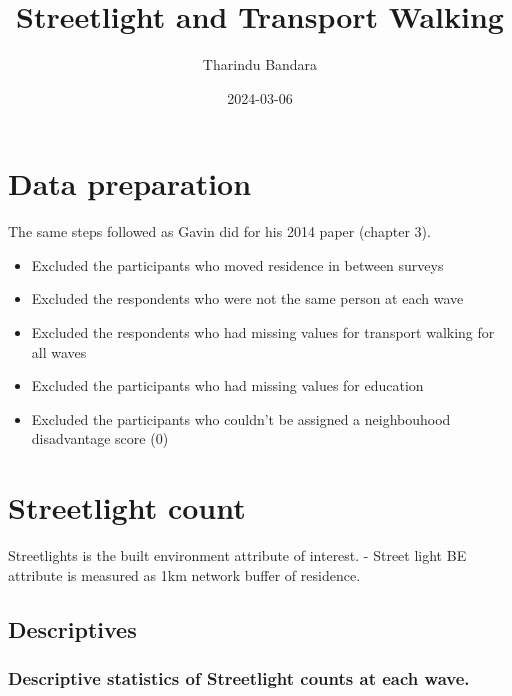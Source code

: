 \documentclass[
]{book}
\title{Streetlight and Transport Walking}
\author{Tharindu Bandara}
\date{2024-03-06}
\providecommand{\tightlist}{%
  \setlength{\itemsep}{0pt}\setlength{\parskip}{0pt}}
\begin{document}
\maketitle

{
\setcounter{tocdepth}{1}
\tableofcontents
}
\hypertarget{data-preparation}{%
\chapter{Data preparation}\label{data-preparation}}

The same steps followed as Gavin did for his 2014 paper (chapter 3).

\begin{itemize}
\tightlist
\item
  Excluded the participants who moved residence in between surveys
\item
  Excluded the respondents who were not the same person at each wave
\item
  Excluded the respondents who had missing values for transport walking for all waves
\item
  Excluded the participants who had missing values for education
\item
  Excluded the participants who couldn't be assigned a neighbouhood disadvantage score (0)
\end{itemize}

\hypertarget{streetlight-count}{%
\chapter{Streetlight count}\label{streetlight-count}}

Streetlights is the built environment attribute of interest.
- Street light BE attribute is measured as 1km network buffer of residence.

\hypertarget{descriptives}{%
\section{Descriptives}\label{descriptives}}

\hypertarget{descriptive-statistics-of-streetlight-counts-at-each-wave.}{%
\subsection{Descriptive statistics of Streetlight counts at each wave.}\label{descriptive-statistics-of-streetlight-counts-at-each-wave.}}
\end{document}
